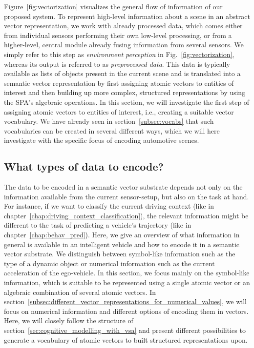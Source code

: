 Figure~\ref{fig:vectorization} visualizes the general flow of information of our proposed system.
To represent high-level information about a scene in an abstract vector representation, we work with already processed data, which comes either from individual sensors performing their own low-level processing, or from a higher-level, central module already fusing information from several sensors.
We simply refer to this step as \emph{environment perception} in Fig.~\ref{fig:vectorization}, whereas its output is referred to as \emph{preprocessed data}.
This data is typically available as lists of objects present in the current scene and is translated into a semantic vector representation by first assigning atomic vectors to entities of interest and then building up more complex, structured representations by using the \ac{SPA}'s algebraic operations.
In this section, we will investigate the first step of assigning atomic vectors to entities of interest, i.e., creating a suitable vector vocabulary.
We have already seen in section~\ref{subsec:vocabs} that such vocabularies can be created in several different ways, which we will here investigate with the specific focus of encoding automotive scenes.

\subsection{What types of data to encode?}%
\label{subsec:what_types_of_data_to_encode_}

The data to be encoded in a semantic vector substrate depends not only on the information available from the current sensor-setup, but also on the task at hand.
For instance, if we want to classify the current driving context (like in chapter~\ref{chap:driving_context_classification}), the relevant information might be different to the task of predicting a vehicle's trajectory (like in chapter~\ref{chap:behav_pred}).
Here, we give an overview of what information in general is available in an intelligent vehicle and how to encode it in a semantic vector substrate.
We distinguish between symbol-like information such as the type of a dynamic object or numerical information such as the current acceleration of the ego-vehicle.
In this section, we focus mainly on the symbol-like information, which is suitable to be represented using a single atomic vector or an algebraic combination of several atomic vectors.
In section~\ref{subsec:different_vector_representations_for_numerical_values}, we will focus on numerical information and different options of encoding them in vectors.
Here, we will closely follow the structure of section~\ref{sec:cognitive_modelling_with_vsa} and present different possibilities to generate a vocabulary of atomic vectors to built structured representations upon.

